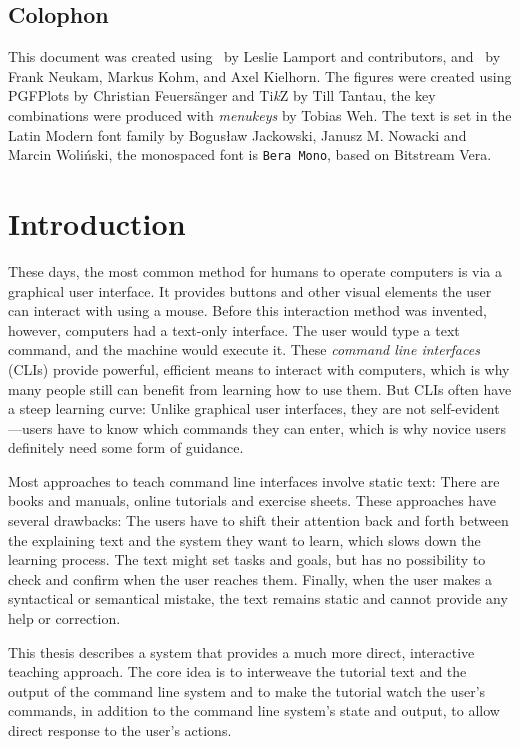 \documentclass[paper=a4,abstract=on,cleardoublepage=empty,numbers=noenddot,toc=bib,12pt,appendixprefix=true]{scrreprt}
\begin{document}
\section*{Colophon}

This document was created using \LaTeXe\ by Leslie Lamport and contributors, and \KOMAScript\ by Frank Neukam, Markus Kohm, and Axel Kielhorn. The figures were created using PGFPlots by Christian Feuersänger and Ti\textit{k}Z by Till Tantau, the key combinations were produced with \emph{menukeys} by Tobias Weh. The text is set in the Latin Modern font family by Bogusław Jackowski, Janusz M. Nowacki and Marcin Woliński, the monospaced font is \texttt{Bera Mono}, based on Bitstream Vera.

\setcounter{tocdepth}{2}
\tableofcontents

\chapter{Introduction}

These days, the most common method for humans to operate computers is via a graphical user interface. It provides buttons and other visual elements the user can interact with using a mouse. Before this interaction method was invented, however, computers had a text-only interface. The user would type a text command, and the machine would execute it. These \emph{command line interfaces} (CLIs) provide powerful, efficient means to interact with computers, which is why many people still can benefit from learning how to use them. But CLIs often have a steep learning curve: Unlike graphical user interfaces, they are not self-evident---users have to know which commands they can enter, which is why novice users definitely need some form of guidance.

Most approaches to teach command line interfaces involve static text: There are books and manuals, online tutorials and exercise sheets. These approaches have several drawbacks: The users have to shift their attention back and forth between the explaining text and the system they want to learn, which slows down the learning process. The text might set tasks and goals, but has no possibility to check and confirm when the user reaches them. Finally, when the user makes a syntactical or semantical mistake, the text remains static and cannot provide any help or correction.

This thesis describes a system that provides a much more direct, interactive teaching approach. The core idea is to interweave the tutorial text and the output of the command line system and to make the tutorial watch the user's commands, in addition to the command line system's state and output, to allow direct response to the user's actions.
\end{document}
